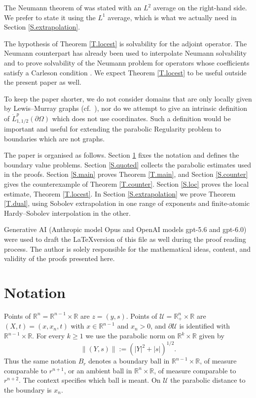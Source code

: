 \documentclass[10pt,a4paper]{amsart}
\numberwithin{equation}{section}
\newcommand{\R}{\mathbb R}
\newcommand{\abs}[1]{\left\vert#1\right\vert}
\newcommand{\br}[1]{\left(#1\right)}
\newcommand{\pom}{\partial\Omega}
\newcommand{\pd}{\partial}
\newcommand{\Uc}{\mathcal U}
\begin{document}
\noindent The Neumann theorem of \cite{DLP2} was stated with an $L^2$ average
on the right-hand side. We prefer to state it using the $L^1$ average, which is what we actually need in Section
\ref{S.extrapolation}.\medskip

The hypothesis of Theorem \ref{T.locest} is solvability for the adjoint
operator. The Neumann counterpart has already been used to interpolate
Neumann solvability \cite{DL,DLP2} and to prove solvability of the Neumann
problem for operators whose coefficients satisfy a Carleson condition
\cite{DLPN}. We expect Theorem \ref{T.locest} to be useful outside the present
paper as well.\medskip

To keep the paper shorter, we do not consider domains that are only
locally given by Lewis--Murray graphs (cf.\ \cite{DDH}), nor do we attempt to
give an intrinsic definition of $\dot L^p_{1,1/2}(\pom)$ which does not use
coordinates. Such a definition would be important and useful for extending the parabolic
Regularity problem to boundaries which are not graphs.\medskip

The paper is organised as follows. Section \ref{S.notation} fixes the
notation and defines the boundary value problems. Section \ref{S.quoted}
collects the parabolic estimates used in the proofs. Section \ref{S.main}
proves Theorem \ref{T.main}, and Section \ref{S.counter} gives the
counterexample of Theorem \ref{T.counter}. Section \ref{S.loc} proves the local
estimate, Theorem \ref{T.locest}. In Section \ref{S.extrapolation} we prove
Theorem \ref{T.dual}, using Sobolev extrapolation in one range of exponents and
finite-atomic Hardy--Sobolev interpolation in the other.\medskip

 Generative AI (Anthropic model Opus and OpenAI models gpt-5.6 and gpt-6.0)
were used to draft the \LaTeX version of this file as well during the proof reading process. The author is solely responsible for the mathematical ideas, content, and validity of the proofs presented here.

\section{Notation}\label{S.notation}

Points of $\R^n=\R^{n-1}\times\R$ are $z=(y,s)$.
Points of $\Uc=\R^n_+\times\R$ are $(X,t)=(x,x_n,t)$ with $x\in\R^{n-1}$ and
$x_n>0$, and $\pd\Uc$ is identified with $\R^{n-1}\times\R$. For every
$k\ge1$ we use the parabolic norm on $\R^k\times\R$ given by
\[
 \|(Y,s)\|:=\br{\abs Y^2+\abs s}^{1/2}.
\]
Thus the same notation $B_r$ denotes a boundary ball in
$\R^{n-1}\times\R$, of measure comparable to $r^{n+1}$, or an ambient ball
in $\R^n\times\R$, of measure comparable to $r^{n+2}$. The context specifies
which ball is meant. On $\Uc$ the parabolic distance to the boundary is
$x_n$.
\end{document}
